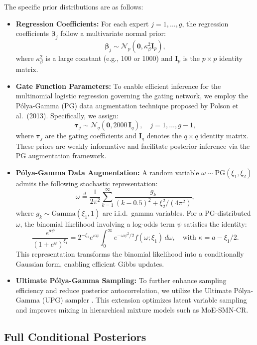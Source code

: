 \documentclass[10.5pt]{article} %
\begin{document}
\noindent
The specific prior distributions are as follows:
\begin{itemize}
   \item \textbf{Regression Coefficients:} For each expert $j = 1, \ldots, g$, the regression coefficients $\boldsymbol{\beta}_j$ follow a multivariate normal prior:
\[
\boldsymbol{\beta}_j \sim \mathcal{N}_p(\mathbf{0}, \kappa_\beta^2 \mathbf{I}_p),
\]
where $\kappa_\beta^2$ is a large constant (e.g., 100 or 1000) and $\mathbf{I}_p$ is the $p \times p$ identity matrix.


    \item \textbf{Gate Function Parameters:} To enable efficient inference for the multinomial logistic regression governing the gating network, we employ the Pólya-Gamma (PG) data augmentation technique proposed by Polson et al.\ (2013). Specifically, we assign:
    \[
    \boldsymbol{\tau}_j \sim \mathcal{N}_q(\mathbf{0}, 2000\, \mathbf{I}_q), \quad j = 1, \ldots, g - 1,
    \]
    where $\boldsymbol{\tau}_j$ are the gating coefficients and $\mathbf{I}_q$ denotes the $q \times q$ identity matrix. These priors are weakly informative and facilitate posterior inference via the PG augmentation framework.

    \item \textbf{Pólya-Gamma Data Augmentation:} A random variable $\omega \sim \text{PG}(\xi_1, \xi_2)$ admits the following stochastic representation:
    \[
    \omega \overset{d}{=} \frac{1}{2\pi^2} \sum_{k=1}^\infty \frac{g_k}{(k - 0.5)^2 + \xi_2^2 / (4\pi^2)},
    \]
    where $g_k \sim \text{Gamma}(\xi_1, 1)$ are i.i.d.\ gamma variables. For a PG-distributed $\omega$, the binomial likelihood involving a log-odds term $\psi$ satisfies the identity:
    \[
    \frac{e^{a \psi}}{(1 + e^\psi)^{\xi_1}} = 2^{-\xi_1} e^{\kappa \psi} \int_0^\infty e^{-\omega \psi^2 / 2} f(\omega; \xi_1)\, d\omega, \quad \text{with } \kappa = a - \xi_1 / 2.
    \]
    This representation transforms the binomial likelihood into a conditionally Gaussian form, enabling efficient Gibbs updates.

    \item \textbf{Ultimate Pólya-Gamma Sampling:} To further enhance sampling efficiency and reduce posterior autocorrelation, we utilize the Ultimate Pólya-Gamma (UPG) sampler . This extension optimizes latent variable sampling and improves mixing in hierarchical mixture models such as MoE-SMN-CR.
\end{itemize}


\subsection{Full Conditional Posteriors}
\end{document}
